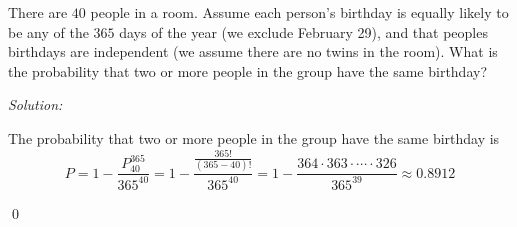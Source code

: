 \documentclass[12pt]{article}
\newenvironment{problem}[2][Problem]{\begin{trivlist}
\item[\hskip \labelsep {\bfseries #1}\hskip \labelsep {\bfseries #2.}]}{\end{trivlist}}
\newenvironment{sol}
    {\emph{Solution:}
    }
    {
    \qed
    }
\begin{document}
\begin{problem}{8}
There are $40$ people in a room. Assume each person's birthday is equally likely to be any of the $365$ days of the year (we exclude February 29), and that peoples birthdays are independent (we assume there are no twins in the room). What is the probability that two or more people in the group have the same birthday?
\end{problem}
\begin{sol}
The probability that two or more people in the group have the same birthday is
\[
P=1-\frac{P_{40}^{365}}{365^{40}}=1-\frac{\frac{365!}{(365-40)!}}{365^{40}}=1-\frac{364\cdot363\cdot\cdots\cdot326}{365^{39}}\approx0.8912
\]
\end{sol}
\end{document}
